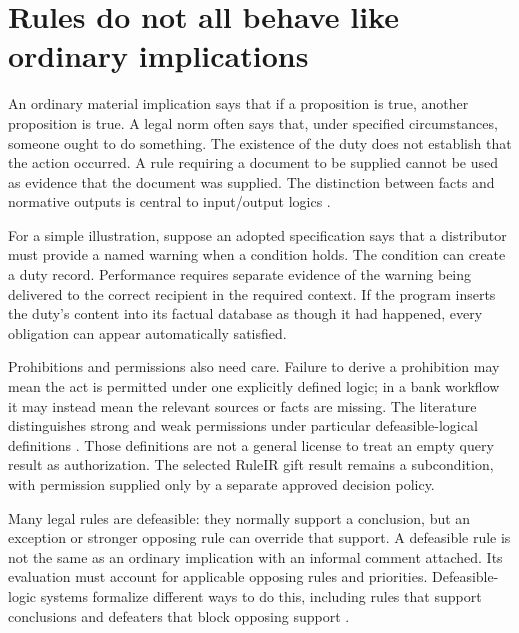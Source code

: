 \section{Rules do not all behave like ordinary implications}
\label{merge:M04:01}

\label{sec:languages-norms}
An ordinary material implication says that if a proposition is true, another
proposition is true. A legal norm often says that, under specified circumstances,
someone ought to do something. The existence of the duty does not establish
that the action occurred. A rule requiring a document to be supplied cannot
be used as evidence that the document was supplied. The distinction between
facts and normative outputs is central to input/output logics
\citep[secs.~2--4]{inputoutput2000}.

For a simple illustration, suppose an adopted specification says that a
distributor must provide a named warning when a condition holds. The condition
can create a duty record. Performance requires separate evidence of the
warning being delivered to the correct recipient in the required context.
If the program inserts the duty's content into its factual database as though
it had happened, every obligation can appear automatically satisfied.

Prohibitions and permissions also need care. Failure to derive a prohibition
may mean the act is permitted under one explicitly defined logic; in a bank
workflow it may instead mean the relevant sources or facts are missing. The
literature distinguishes strong and weak permissions under particular
defeasible-logical definitions \citep[secs.~2--4]{permissions2012}. Those
definitions are not a general license to treat an empty query result as
authorization. The selected RuleIR gift result remains a subcondition, with
permission supplied only by a separate approved decision policy.


Many legal rules are defeasible: they normally support a conclusion, but an
exception or stronger opposing rule can override that support. A defeasible
rule is not the same as an ordinary implication with an informal comment
attached. Its evaluation must account for applicable opposing rules and
priorities. Defeasible-logic systems formalize different ways to do this,
including rules that support conclusions and defeaters that block opposing
support \citep[sec.~2]{defeasible2000}.

